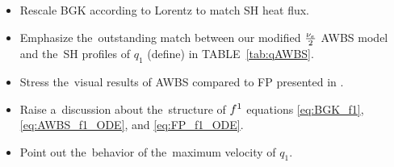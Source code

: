 \begin{itemize}
  \item Rescale BGK according to Lorentz to match SH heat flux.
  \item Emphasize the~outstanding match between our modified $\frac{\nu_{e}}{2}$
        AWBS model and the~SH profiles of $q_1$ (define) in 
		TABLE~\ref{tab:qAWBS}.
  \item Stress the~visual results of AWBS compared to FP presented in 
        . 
  \item Raise a~discussion about the~structure of $f^1$ equations
        \eqref{eq:BGK_f1}, \eqref{eq:AWBS_f1_ODE}, and 
        \eqref{eq:FP_f1_ODE}.
  \item Point out the~behavior of the~maximum velocity of $q_1$.
\end{itemize}

